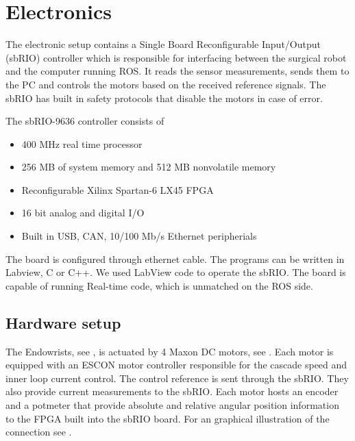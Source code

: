 \section{Electronics}\label{sec:electronics}

The electronic setup contains a Single Board Reconfigurable Input/Output (sbRIO) controller which is responsible for interfacing between the surgical robot and the computer running ROS. It reads the sensor measurements, sends them to the PC and controls the motors based on the received reference signals. The sbRIO has built in safety protocols that disable the motors in case of error.

The sbRIO-9636 controller consists of
\begin{itemize}
	\item 400 MHz real time processor
	\item 256 MB of system memory and 512 MB nonvolatile memory
	\item Reconfigurable Xilinx Spartan-6 LX45 FPGA
	\item 16 bit analog and digital I/O
	\item Built in USB, CAN, 10/100 Mb/s Ethernet peripherials
\end{itemize}

The board is configured through ethernet cable. The programs can be written in Labview, C or C++. We used LabView code to operate the sbRIO. The board is capable of running Real-time code, which is unmatched on the ROS side.


\subsection{Hardware setup}

The Endowrists, see , is actuated by 4 Maxon DC motors, see . Each motor is equipped with an ESCON motor controller responsible for the cascade speed and inner loop current control. The control reference is sent through the sbRIO. They also provide current measurements to the sbRIO. Each motor hosts an encoder and a potmeter that provide absolute and relative angular position information to the FPGA built into the sbRIO board. For an graphical illustration of the connection see .
 
